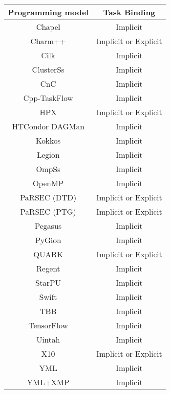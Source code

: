 \begin{tabular}{cc}
\hline
Programming model & Task Binding \\
\hline
Chapel & Implicit\\
Charm++ & Implicit or Explicit\\
Cilk & Implicit\\
ClusterSs & Implicit\\
CnC & Implicit\\
Cpp-TaskFlow & Implicit\\
HPX & Implicit or Explicit\\
HTCondor DAGMan & Implicit\\
Kokkos & Implicit\\
Legion & Implicit\\
OmpSs & Implicit\\
OpenMP & Implicit\\
PaRSEC (DTD) & Implicit or Explicit\\
PaRSEC (PTG) & Implicit or Explicit\\
Pegasus & Implicit\\
PyGion & Implicit\\
QUARK & Implicit or Explicit\\
Regent & Implicit\\
StarPU & Implicit\\
Swift & Implicit\\
TBB & Implicit\\
TensorFlow & Implicit\\
Uintah & Implicit\\
X10 & Implicit or Explicit\\
YML & Implicit\\
YML+XMP & Implicit\\
\hline
\end{tabular}
